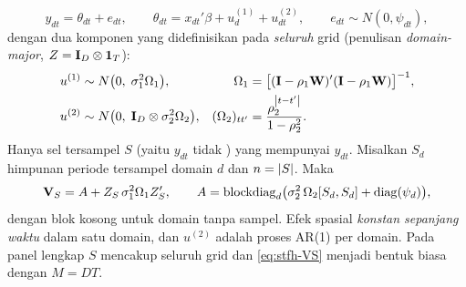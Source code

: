 \begin{equation}
  y_{dt}=\theta_{dt}+e_{dt},\qquad
  \theta_{dt}=x_{dt}'\beta+u^{(1)}_d+u^{(2)}_{dt},
  \qquad e_{dt}\sim N(0,\psi_{dt}),
  \label{eq:stfh-model}
\end{equation}
dengan dua komponen yang didefinisikan pada \emph{seluruh} grid (penulisan
\emph{domain-major}, $Z=\mathbf{I}_D\otimes\mathbf 1_T$):
\begin{align}
  u^{(1)} &\sim N\bigl(0,\;\sigma_1^2\Omega_1\bigr),
    &\Omega_1&=\bigl[(\mathbf{I}-\rho_1\mathbf{W})'(\mathbf{I}-\rho_1\mathbf{W})\bigr]^{-1},
    \label{eq:stfh-spatial}\\
  u^{(2)} &\sim N\bigl(0,\;\mathbf{I}_D\otimes\sigma_2^2\Omega_2\bigr),
    &(\Omega_2)_{tt'}&=\frac{\rho_2^{\left|t-t'\right|}}{1-\rho_2^2}.
    \label{eq:stfh-temporal}
\end{align}
Hanya sel tersampel $S$ (yaitu $y_{dt}$ tidak ) yang mempunyai
$y_{dt}$. Misalkan $S_d$ himpunan periode tersampel domain $d$ dan
$n=\left|S\right|$. Maka
\begin{equation}
  \mathbf{V}_S=A+Z_S\,\sigma_1^2\Omega_1Z_S',\qquad
  A=\mathrm{blockdiag}_d\bigl(\sigma_2^2\,\Omega_2[S_d,S_d]+\operatorname{diag}(\psi_d)\bigr),
  \label{eq:stfh-VS}
\end{equation}
dengan blok kosong untuk domain tanpa sampel. Efek spasial \emph{konstan
sepanjang waktu} dalam satu domain, dan $u^{(2)}$ adalah proses AR(1) per
domain. Pada panel lengkap $S$ mencakup seluruh grid dan
\eqref{eq:stfh-VS} menjadi bentuk biasa dengan $M=DT$.


